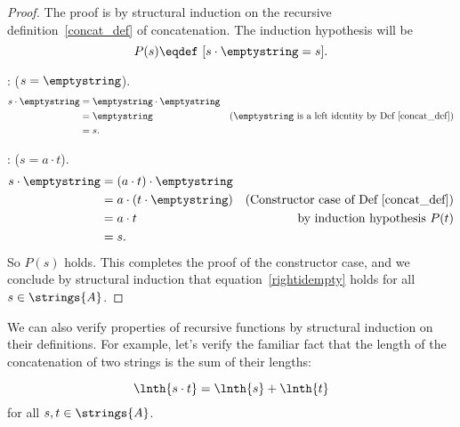 \begin{proof}
The proof is by structural induction on the recursive
definition~\ref{concat_def} of concatenation.  The induction
hypothesis will be
\[
P(s) \eqdef\ [s \cdot \emptystring = s].
\]

: ($s = \emptystring$).
\begin{align*}
s \cdot \emptystring
    & = \emptystring \cdot \emptystring\\
    & = \emptystring
        & \text{($\emptystring$ is a left identity by Def~\ref{concat_def})}\\
    & = s.
\end{align*}

: ($s = a \cdot t$).
\begin{align*}
s \cdot \emptystring
   & =(a \cdot t) \cdot \emptystring\\
   & = a \cdot (t \cdot \emptystring)
       & \text{(Constructor case of Def~\ref{concat_def})}\\
   & = a \cdot t
        & \text{by induction hypothesis $P(t)$}\\
   & = s.
\end{align*}
So $P(s)$ holds.  This completes the proof of the constructor case,
and we conclude by structural induction that
equation~\eqref{rightidempty} holds for all $s \in \strings{A}$.
\end{proof}

We can also verify properties of recursive functions by structural
induction on their definitions.  For example, let's verify the
familiar fact that the length of the concatenation of two strings is
the sum of their lengths:

\begin{lemma*}
\[
\lnth{s\cdot t} = \lnth{s} + \lnth{t}
\]
for all $s,t \in \strings{A}$.
\end{lemma*}

